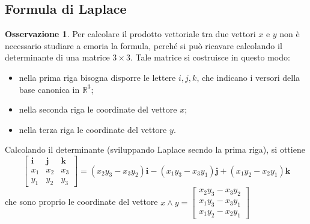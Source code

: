 \documentclass{book}
\theoremstyle{definition}
\newtheorem{oss}{Osservazione}[section]
\theoremstyle{plain}
\begin{document}
\subsection{Formula di Laplace}
\label{sec:formlaplace}
\begin{oss}
  \label{oss:formlaplace}
  Per calcolare il prodotto vettoriale tra due vettori $x$ e $y$ non è
  necessario studiare a emoria la formula, perché si può ricavare
  calcolando il determinante di una matrice $3\times 3$. Tale matrice si
  costruisce in questo modo:
  \begin{itemize}
  \item nella prima riga bisogna disporre le lettere $i,j,k$, che indicano
    i versori della base canonica in $\mathds{R}^3$;
  \item nella seconda riga le coordinate del vettore $x$;
  \item nella terza riga le coordinate del vettore $y$.
  \end{itemize}
  Calcolando il determinante (sviluppando Laplace secndo la prima riga),
  si ottiene
  \begin{equation*}
    \begin{bmatrix}
      \mathbf{i} & \mathbf{j} &\mathbf{k}\\
      x_1 & x_2 & x_3\\
      y_1 & y_2 & y_3
    \end{bmatrix}=(x_2y_3-x_3y_2)\mathbf{i}-(x_1y_3-x_3y_1)\mathbf{j}
    +(x_1y_2-x_2y_1)\mathbf{k}
  \end{equation*}
  che sono proprio le coordinate del vettore $x\wedge y=
  \begin{bmatrix}
    x_2y_3-x_3y_2\\
    x_1y_3-x_3y_1\\
    x_1y_2-x_2y_1
  \end{bmatrix}
  $
\end{oss}
\end{document}
